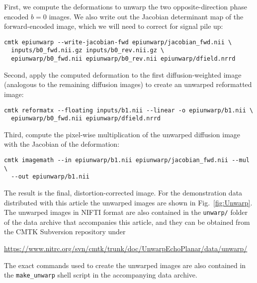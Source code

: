 \documentclass{InsightArticle}
\begin{document}
First, we compute the deformations to unwarp the two opposite-direction phase
encoded $b=0$ images. We also write out the Jacobian determinant map of the
forward-encoded image, which we will need to correct for signal pile up:
\begin{verbatim}
cmtk epiunwarp --write-jacobian-fwd epiunwarp/jacobian_fwd.nii \
  inputs/b0_fwd.nii.gz inputs/b0_rev.nii.gz \
  epiunwarp/b0_fwd.nii epiunwarp/b0_rev.nii epiunwarp/dfield.nrrd
\end{verbatim}
Second, apply the computed deformation to the first diffusion-weighted image
(analogous to the remaining diffusion images) to create an unwarped
reformatted image:
\begin{verbatim}
cmtk reformatx --floating inputs/b1.nii --linear -o epiunwarp/b1.nii \
  epiunwarp/b0_fwd.nii epiunwarp/dfield.nrrd
\end{verbatim}
Third, compute the pixel-wise multiplication of the unwarped diffusion image
with the Jacobian of the deformation:
\begin{verbatim}
cmtk imagemath --in epiunwarp/b1.nii epiunwarp/jacobian_fwd.nii --mul \
  --out epiunwarp/b1.nii
\end{verbatim}
The result is the final, distortion-corrected image. For the demonstration
data distributed with this article the unwarped images are shown in
Fig.~\ref{fig:Unwarp}. The unwarped images in NIFTI format are also
contained in the \verb|unwarp/| folder of the data archive that accompanies
this article, and they can be obtained from the CMTK Subversion repository
under

\centerline{\url{https://www.nitrc.org/svn/cmtk/trunk/doc/UnwarpEchoPlanar/data/unwarp/}}

The exact commands used to create the unwarped images are also contained in
the \verb|make_unwarp| shell script in the accompanying data archive.
\end{document}
